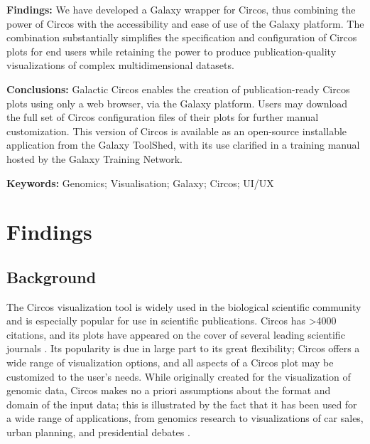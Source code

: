 \textbf{Findings:}
We have developed a Galaxy wrapper for Circos, thus combining the power of Circos with the accessibility and ease of use of the Galaxy platform. The combination substantially simplifies the specification and configuration of Circos plots for end users while retaining the power to produce publication-quality visualizations of complex multidimensional datasets.

\textbf{Conclusions:}
Galactic Circos enables the creation of publication-ready Circos plots using only a web browser, via the Galaxy platform. Users may download the full set of Circos configuration files of their plots for further manual customization. This version of Circos is available as an open-source installable application from the Galaxy ToolShed, with its use clarified in a training manual hosted by the Galaxy Training Network.

\textbf{Keywords: } Genomics; Visualisation; Galaxy; Circos; UI/UX


\section*{Findings}

\subsection*{Background}


The Circos visualization tool \cite{krzywinski2009} is widely used in the biological scientific community and is especially popular for use in scientific publications. Circos has >4000 citations, and its plots have appeared on the cover of several leading scientific journals \cite{circospubs}.  Its popularity is due in large part to its great flexibility; Circos offers a wide range of visualization options, and all aspects of a Circos plot may be customized to the user’s needs. While originally created for the visualization of genomic data, Circos makes no a priori assumptions about the format and domain of the input data; this is illustrated by the fact that it has been used for a wide range of applications, from genomics research to visualizations of car sales, urban planning, and presidential debates \cite{circosnongenomic}.

